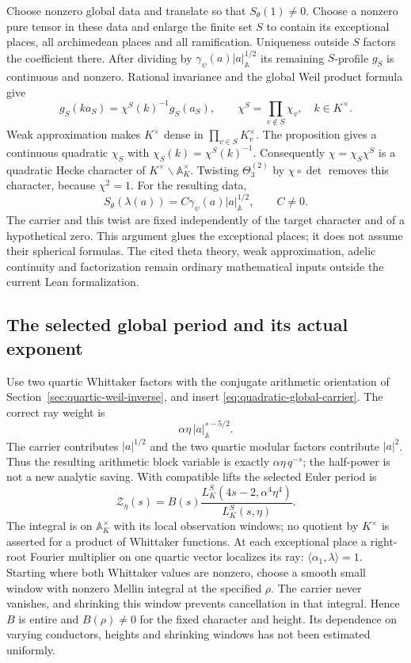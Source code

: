 \documentclass[11pt]{article}
\begin{document}
Choose nonzero global data and translate so that $S_\theta(1)\ne0$.
Choose a nonzero pure tensor in these data and enlarge the finite set
$S$ to contain its exceptional places, all archimedean places and
all ramification. Uniqueness outside $S$ factors the coefficient
there. After dividing by $\gamma_\psi(a)|a|_{\mathbb A}^{1/2}$ its
remaining $S$-profile $g_S$ is continuous and nonzero. Rational
invariance and the global Weil product formula give
\[
 g_S(k a_S)=\chi^S(k)^{-1}g_S(a_S),\qquad
 \chi^S=\prod_{v\notin S}\chi_v,\quad k\in K^\times.
\]
Weak approximation makes $K^\times$ dense in
$\prod_{v\in S}K_v^\times$. The proposition gives a continuous
quadratic $\chi_S$ with $\chi_S(k)=\chi^S(k)^{-1}$.
Consequently $\chi=\chi_S\chi^S$ is a quadratic Hecke character
of $K^\times\backslash\mathbb A_K^\times$.
Twisting $\Theta^{(2)}_3$ by $\chi\circ\det$ removes this character,
because $\chi^2=1$. For the resulting data,
\begin{equation}\label{eq:quadratic-global-carrier}
 S_\theta(\lambda(a))=C\gamma_\psi(a)|a|_{\mathbb A}^{1/2},
 \qquad C\ne0 .
\end{equation}
The carrier and this twist are fixed independently of the target
character and of a hypothetical zero. This argument glues the
exceptional places; it does not assume their spherical formulas.
The cited theta theory, weak approximation, adelic continuity and
factorization remain ordinary mathematical inputs outside the
current Lean formalization.

\subsection{The selected global period and its actual exponent}
Use two quartic Whittaker factors with the conjugate arithmetic
orientation of Section~\ref{sec:quartic-weil-inverse}, and insert
\eqref{eq:quadratic-global-carrier}. The correct ray weight is
\[
 \alpha\eta\,|a|_{\mathbb A}^{s-5/2}.
\]
The carrier contributes $|a|^{1/2}$ and the two quartic modular
factors contribute $|a|^2$. Thus the resulting arithmetic block
variable is exactly $\alpha\eta\,q^{-s}$; the half-power is not a
new analytic saving. With compatible lifts the selected Euler
period is
\[
 \mathcal Z_\eta(s)=B(s)
       \frac{L_K^S(4s-2,\alpha^4\eta^4)}{L_K^S(s,\eta)}.
\]
The integral is on $\mathbb A_K^\times$ with its local observation
windows; no quotient by $K^\times$ is asserted for a product of
Whittaker functions. At each exceptional place a right-root
Fourier multiplier on one quartic vector localizes its ray:
$\langle\alpha_1,\lambda\rangle=1$.
Starting where both Whittaker values are nonzero, choose a smooth
small window with nonzero Mellin integral at the specified
$\rho$. The carrier never vanishes, and shrinking this window
prevents cancellation in that integral. Hence $B$ is entire
and $B(\rho)\ne0$ for the fixed character and height.
Its dependence on varying conductors, heights and shrinking
windows has not been estimated uniformly.
\end{document}
